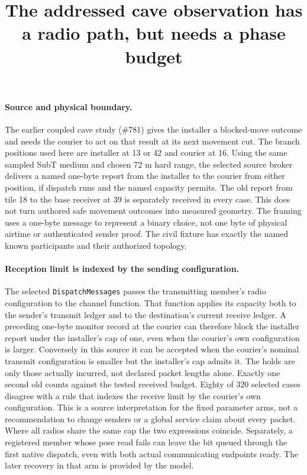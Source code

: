 \documentclass{article}
\begin{document}
\title{The addressed cave observation has a radio path, but needs a phase budget}
\maketitle

\paragraph{Source and physical boundary.}
The earlier coupled cave study (\#781) gives the installer a
blocked-move outcome and needs the courier to act on that result
at its next movement cut. The branch positions used here are
installer at 13 or 42 and courier at 16. Using the same sampled
SubT medium and chosen 72 m hard range, the selected source
broker delivers a named one-byte report from the installer to the
courier from either position, if dispatch runs and the named
capacity permits. The old report from tile 18 to the base
receiver at 39 is separately received in every case.
This does not turn authored safe movement outcomes into measured
geometry. The framing uses a one-byte message to represent a
binary choice, not one byte of physical airtime or authenticated
sender proof. The civil fixture has exactly the named known
participants and their authorized topology.

\paragraph{Reception limit is indexed by the sending configuration.}
The selected \texttt{DispatchMessages} passes the transmitting
member's radio configuration to the channel function. That
function applies its capacity both to the sender's transmit
ledger and to the destination's current receive ledger.
A preceding one-byte monitor record at the courier can therefore
block the installer report under the installer's cap of one,
even when the courier's own configuration is larger. Conversely
in this source it can be accepted when the courier's nominal
transmit configuration is smaller but the installer's cap
admits it. The holds are only those actually incurred, not
declared packet lengths alone. Exactly one second old counts
against the tested received budget. Eighty of 320 selected
cases disagree with a rule that indexes the receive
limit by the courier's own configuration. This is a source
interpretation for the fixed parameter arms, not a recommendation
to change senders or a global service claim about every packet.
Where all radios share the same cap the two expressions coincide.
Separately, a registered member whose pose read fails can leave
the bit queued through the first native dispatch, even with
both actual communicating endpoints ready. The later recovery
in that arm is provided by the model.
\end{document}
